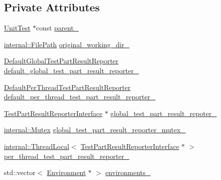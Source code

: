 \subsection*{Private Attributes}
\begin{DoxyCompactItemize}
\item 
\hyperlink{classtesting_1_1UnitTest}{Unit\+Test} $\ast$const \hyperlink{classtesting_1_1internal_1_1UnitTestImpl_adabbbc8985202ce655d50746bd383eae}{parent\+\_\+}
\item 
\hyperlink{classtesting_1_1internal_1_1FilePath}{internal\+::\+File\+Path} \hyperlink{classtesting_1_1internal_1_1UnitTestImpl_aaf1f1d4cbb2f681ded9bbf4c6075430c}{original\+\_\+working\+\_\+dir\+\_\+}
\item 
\hyperlink{classtesting_1_1internal_1_1DefaultGlobalTestPartResultReporter}{Default\+Global\+Test\+Part\+Result\+Reporter} \hyperlink{classtesting_1_1internal_1_1UnitTestImpl_a645122eda4d8250f3e8139309510705e}{default\+\_\+global\+\_\+test\+\_\+part\+\_\+result\+\_\+reporter\+\_\+}
\item 
\hyperlink{classtesting_1_1internal_1_1DefaultPerThreadTestPartResultReporter}{Default\+Per\+Thread\+Test\+Part\+Result\+Reporter} \hyperlink{classtesting_1_1internal_1_1UnitTestImpl_a261ddbea097ad3b43b8b510a4964f390}{default\+\_\+per\+\_\+thread\+\_\+test\+\_\+part\+\_\+result\+\_\+reporter\+\_\+}
\item 
\hyperlink{classtesting_1_1TestPartResultReporterInterface}{Test\+Part\+Result\+Reporter\+Interface} $\ast$ \hyperlink{classtesting_1_1internal_1_1UnitTestImpl_ab9a275094df6adc7e16a92133a692c3e}{global\+\_\+test\+\_\+part\+\_\+result\+\_\+repoter\+\_\+}
\item 
\hyperlink{classtesting_1_1internal_1_1Mutex}{internal\+::\+Mutex} \hyperlink{classtesting_1_1internal_1_1UnitTestImpl_a57153c5c8caa229f0a62f35ab99f0a56}{global\+\_\+test\+\_\+part\+\_\+result\+\_\+reporter\+\_\+mutex\+\_\+}
\item 
\hyperlink{classtesting_1_1internal_1_1ThreadLocal}{internal\+::\+Thread\+Local}$<$ \hyperlink{classtesting_1_1TestPartResultReporterInterface}{Test\+Part\+Result\+Reporter\+Interface} $\ast$ $>$ \hyperlink{classtesting_1_1internal_1_1UnitTestImpl_a23ebe35dfe19dcda8e7b17e81f2cb4bc}{per\+\_\+thread\+\_\+test\+\_\+part\+\_\+result\+\_\+reporter\+\_\+}
\item 
std\+::vector$<$ \hyperlink{classtesting_1_1Environment}{Environment} $\ast$ $>$ \hyperlink{classtesting_1_1internal_1_1UnitTestImpl_a1d2320ba1e4e1cad8d624bbb222501fb}{environments\+\_\+}

\end{DoxyCompactItemize}
